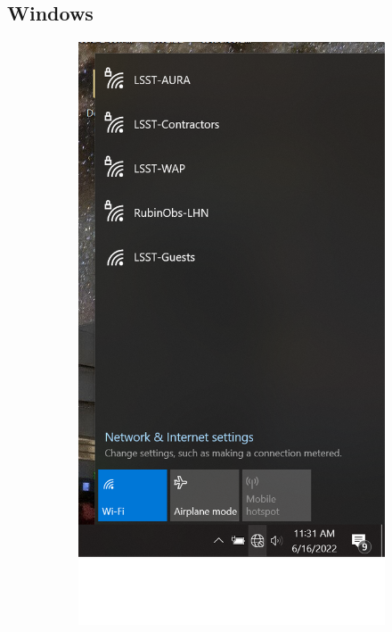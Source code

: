 \newpage
  \vspace{20mm}
  \subsection{Windows}
  \begin{figure}
    \centering
    \begin{subfigure}{0.35\textwidth}
      \includegraphics[width=\textwidth]{Images/Windows1.png}

\end{subfigure}
\end{figure}
